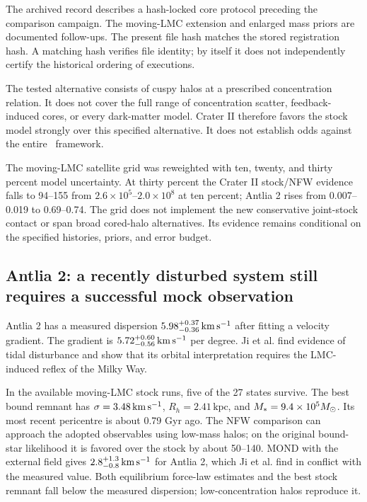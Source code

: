 The archived record describes a hash-locked core protocol preceding the
comparison campaign. The moving-LMC extension and enlarged mass priors
are documented follow-ups.
The present file hash matches the stored registration hash. A matching
hash verifies file identity; by itself it does not independently certify
the historical ordering of executions. 

The tested alternative consists of cuspy halos at a prescribed
concentration relation. It does not cover the full range of concentration
scatter, feedback-induced cores, or every dark-matter model. Crater II
therefore favors the stock model strongly over this specified alternative.
It does not establish odds against the entire \LCDM\ framework.

The moving-LMC satellite grid was reweighted with ten, twenty, and
thirty percent model uncertainty. At thirty percent the Crater II
stock/NFW evidence falls to 94--155 from $2.6\times10^5$--$2.0\times10^8$
at ten percent; Antlia 2 rises from 0.007--0.019 to 0.69--0.74.
The grid does not implement the new conservative joint-stock contact
or span broad cored-halo alternatives. Its evidence remains conditional
on the specified histories, priors, and error budget. 

\subsection{Antlia 2: a recently disturbed system still requires a successful mock observation}
\label{sec:antlia}

Antlia 2 has a measured dispersion
$5.98^{+0.37}_{-0.36}\,\mathrm{km\,s^{-1}}$ after fitting a velocity gradient.
The gradient is $5.72^{+0.60}_{-0.56}\,\mathrm{km\,s^{-1}}$ per degree. Ji et al. find
evidence of tidal disturbance and show that its orbital interpretation
requires the LMC-induced reflex of the Milky Way. \cite{ji}

In the available moving-LMC stock runs, five of the 27 states survive.
The best bound remnant has $\sigma=3.48\,\mathrm{km\,s^{-1}}$,
$R_h=2.41\,\mathrm{kpc}$, and $M_*=9.4\times10^5M_\odot$.
Its most recent pericentre is about 0.79 Gyr ago. The NFW comparison can
approach the adopted observables using low-mass halos; on the original
bound-star likelihood it is favored over the stock by about 50--140.
MOND with the external field gives $2.8^{+1.3}_{-0.8}\,\mathrm{km\,s^{-1}}$ for Antlia
2, which Ji et al. find in conflict with the measured value. Both
equilibrium force-law estimates and the best stock remnant fall below the
measured dispersion; low-concentration halos reproduce it.

